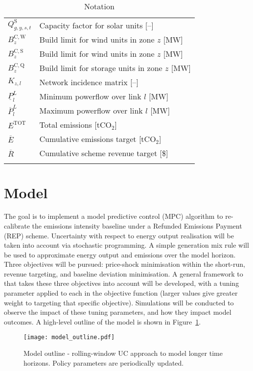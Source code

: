 \documentclass{article}
\newcommand{\iGenerator}{g}
\newcommand{\iYear}{y}
\newcommand{\iScenario}{s}
\newcommand{\iInterval}{t}
\newcommand{\iZone}{z}
\newcommand{\iLink}{l}
\newcommand{\cBuildLimitWind}{B^{\mathrm{C,\mathrm{W}}}_{\iZone}}
\newcommand{\cBuildLimitSolar}{B^{\mathrm{C,\mathrm{S}}}_{\iZone}}
\newcommand{\cBuildLimitStorage}{B^{\mathrm{C,\mathrm{Q}}}_{\iZone}}
\newcommand{\cCapacityFactorSolar}[1][\iGenerator,\iYear,\iScenario,\iInterval]{Q_{#1}^{\mathrm{S}}}
\newcommand{\cIncidenceMatrix}[1][\iZone,\iLink]{K_{#1}}
\newcommand{\cPowerFlowMin}{\underline{P}_{\iLink}^{L}}
\newcommand{\cPowerFlowMax}{\overline{P}_{\iLink}^{L}}
\newcommand{\cEmmissionsCumulativeTarget}{\overline{E}}
\newcommand{\cSchemeRevenueCumulativeTarget}{\overline{R}}
\newcommand{\cEmissionsTotal}{E^{\mathrm{TOT}}}
\begin{document}
\begin{longtable}{ p{}  p{}}
	$\cCapacityFactorSolar$ & Capacity factor for solar units [--]\\
	$\cBuildLimitWind$ & Build limit for wind units in zone $\iZone$ [MW]\\
	$\cBuildLimitSolar$ & Build limit for wind units in zone $\iZone$ [MW]\\
	$\cBuildLimitStorage$ & Build limit for storage units in zone $\iZone$ [MW]\\
	$\cIncidenceMatrix$ & Network incidence matrix [--]\\
	$\cPowerFlowMin$ & Minimum powerflow over link $\iLink$ [MW]\\
	$\cPowerFlowMax$ & Maximum powerflow over link $\iLink$ [MW]\\
	$\cEmissionsTotal$ & Total emissions [tCO$_{2}$]\\
	$\cEmmissionsCumulativeTarget$ & Cumulative emissions target [tCO$_{2}$]\\
	$\cSchemeRevenueCumulativeTarget$ & Cumulative scheme revenue target [\$]\\
	\hline
	\caption{Notation}
\end{longtable}

\section{Model}
The goal is to implement a model predictive control (MPC) algorithm to re-calibrate the emissions intensity baseline under a Refunded Emissions Payment (REP) scheme. Uncertainty with respect to energy output realisation will be taken into account via stochastic programming. A simple generation mix rule will be used to approximate energy output and emissions over the model horizon. Three objectives will be pursued: price-shock minimisation within the short-run, revenue targeting, and baseline deviation minimisation. A general framework to that takes these three objectives into account will be developed, with a tuning parameter applied to each in the objective function (larger values give greater weight to targeting that specific objective). Simulations will be conducted to observe the impact of these tuning parameters, and how they impact model outcomes. A high-level outline of the model is shown in Figure~\ref{fig: model outline}.

\begin{figure}
	\texttt{[image: model\_outline.pdf]}
	\caption{Model outline - rolling-window UC approach to model longer time horizons. Policy parameters are periodically updated.}
	\label{fig: model outline}
\end{figure}
\end{document}
